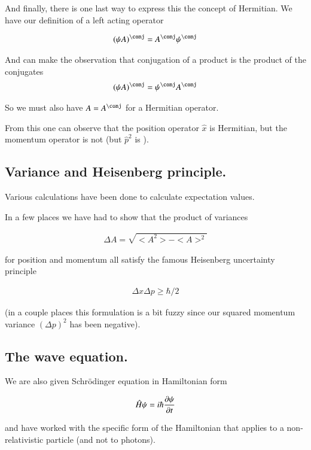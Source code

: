 And finally, there is one last way to express this the concept of Hermitian.
We have our definition of a left acting operator

\begin{align*}
(\psi A)^\conj = A^\conj \psi^\conj
\end{align*}

And can make the observation that conjugation of a product is the 
product of the conjugates
\begin{align*}
(\psi A)^\conj = \psi^\conj A^\conj
\end{align*}

So we must also have $A = A^\conj$ for a Hermitian operator.  

From this one can observe that the position operator $\hat{x}$ is Hermitian, but the momentum operator is not (but $\hat{p}^2$ is ).

\subsection{Variance and Heisenberg principle. }

Various calculations have been done to calculate expectation values.

In a few places we have had to show that the product of variances

\begin{align*}
\Delta A = \sqrt{<A^2> - <A>^2}
\end{align*}

for position and momentum all satisfy the famous Heisenberg uncertainty
principle

\begin{align*}
\Delta x \Delta p \ge \hbar/2
\end{align*}

(in a couple places this formulation is a bit fuzzy since our squared
momentum variance $(\Delta p)^2$ has been negative).

\subsection{The wave equation. }

We are also given Schr\"{o}dinger equation in Hamiltonian form

\begin{align*}
\hat{H} \psi = i \hbar \frac{\partial {\psi}}{\partial {t}}
\end{align*}

and have worked with the specific form of the Hamiltonian that applies to
a non-relativistic particle (and not to photons).

